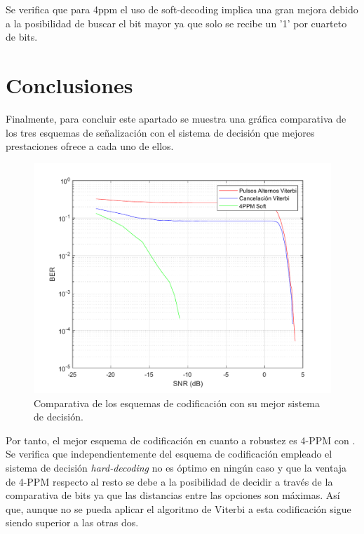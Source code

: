 Se verifica que para 4ppm el uso de soft-decoding implica una gran mejora debido a 
la posibilidad de buscar el bit mayor ya que solo se recibe un '1' por cuarteto de bits.
\newpage
\section{Conclusiones}
Finalmente, para concluir este apartado se muestra una gráfica comparativa de los 
tres esquemas de señalización con el sistema de decisión que mejores prestaciones ofrece
a cada uno de ellos.

\begin{figure}[ht]
    \centering
    \includegraphics[scale=0.6]{./figuras/Comparativa.pdf}
    \caption{\small{Comparativa de los esquemas de codificación con su mejor sistema de decisión.}}
    \label{comparativa}%
\end{figure}

Por tanto, el mejor esquema de codificación en cuanto a robustez es 4-PPM con 
. Se verifica que independientemente del esquema de codificación 
empleado el sistema de decisión \textit{hard-decoding} no es óptimo en ningún caso y 
que la ventaja de 4-PPM respecto al resto se debe a la posibilidad de decidir a través
de la comparativa de bits ya que las distancias entre las opciones son máximas. Así que,
aunque no se pueda aplicar el algoritmo de Viterbi a esta codificación sigue siendo 
superior a las otras dos.

\chapterend{}
